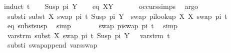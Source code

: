 \begin{isabellebody}
{\isacharparenleft}{\kern0pt}induct\ t{}{\isacharparenright}{\kern0pt}\isanewline
\ \ \isamarkupfalse%
\ {\isacharparenleft}{\kern0pt}Susp\ pi{\isacharprime}{\kern0pt}\ Y{\isacharparenright}{\kern0pt}\isanewline
\ \ \isamarkupfalse%
\ eq{\isacharcolon}{\kern0pt}\ {\isachardoublequoteopen}X{\isacharequal}{\kern0pt}Y{\isachardoublequoteclose}\ \isanewline
\ \ \ \ \isamarkupfalse%
\ occurs{\isachardot}{\kern0pt}simps{\isacharparenleft}{\kern0pt}{}{\isacharparenright}{\kern0pt}\ \isamarkupfalse%
\ argo\isanewline
\ \ \isamarkupfalse%
\ subst{\isacharunderscore}{\kern0pt}i{\isacharcolon}{\kern0pt}\ {\isachardoublequoteopen}subst\ {\isacharbrackleft}{\kern0pt}{\isacharparenleft}{\kern0pt}X{\isacharcomma}{\kern0pt}\ swap\ pi\ t{}{\isacharparenright}{\kern0pt}{\isacharbrackright}{\kern0pt}\ {\isacharparenleft}{\kern0pt}Susp\ pi{\isacharprime}{\kern0pt}\ Y{\isacharparenright}{\kern0pt}\ {\isacharequal}{\kern0pt}\ swap\ pi{\isacharprime}{\kern0pt}{\isacharparenleft}{\kern0pt}look{\isacharunderscore}{\kern0pt}up\ X\ {\isacharbrackleft}{\kern0pt}{\isacharparenleft}{\kern0pt}X{\isacharcomma}{\kern0pt}\ swap\ pi\ t{}{\isacharparenright}{\kern0pt}{\isacharbrackright}{\kern0pt}{\isacharparenright}{\kern0pt}{\isachardoublequoteclose}\isanewline
\ \ \ \ \isamarkupfalse%
\ eq\ subst{\isacharunderscore}{\kern0pt}susp\ \isamarkupfalse%
\ simp\isanewline
\ \ \isamarkupfalse%
\ \isamarkupfalse%
\ {\isachardoublequoteopen}{\isachardot}{\kern0pt}{\isachardot}{\kern0pt}{\isachardot}{\kern0pt}\ {\isacharequal}{\kern0pt}\ swap\ pi{\isacharprime}{\kern0pt}{\isacharparenleft}{\kern0pt}swap\ pi\ t{}{\isacharparenright}{\kern0pt}{\isachardoublequoteclose}\ \isamarkupfalse%
\ simp\isanewline
\ \ \isamarkupfalse%
\ {\isachardoublequoteopen}vars{\isacharunderscore}{\kern0pt}trm\ {\isacharparenleft}{\kern0pt}subst\ {\isacharbrackleft}{\kern0pt}{\isacharparenleft}{\kern0pt}X{\isacharcomma}{\kern0pt}\ swap\ pi\ t{}{\isacharparenright}{\kern0pt}{\isacharbrackright}{\kern0pt}\ {\isacharparenleft}{\kern0pt}Susp\ pi{\isacharprime}{\kern0pt}\ Y{\isacharparenright}{\kern0pt}{\isacharparenright}{\kern0pt}\ {\isacharequal}{\kern0pt}\ \ vars{\isacharunderscore}{\kern0pt}trm\ t{}{\isachardoublequoteclose}\isanewline
\ \ \ \ \isamarkupfalse%
\ subst{\isacharunderscore}{\kern0pt}i\ swap{\isacharunderscore}{\kern0pt}append\ vars{\isacharunderscore}{\kern0pt}swap\ \isamarkupfalse%

\end{isabellebody}
